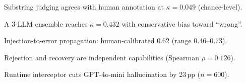 \begin{highlights}
\item Substring judging agrees with human annotation at $\kappa=0.049$ (chance-level).
\item A 3-LLM ensemble reaches $\kappa=0.432$ with conservative bias toward ``wrong''.
\item Injection-to-error propagation: human-calibrated 0.62 (range 0.46--0.73).
\item Rejection and recovery are independent capabilities (Spearman $\rho=0.126$).
\item Runtime interceptor cuts GPT-4o-mini hallucination by 23\,pp ($n{=}600$).
\end{highlights}
